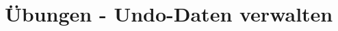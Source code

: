 \section{Übungen - Undo-Daten verwalten}
  \begin{enumerate}
    

    
    \begin{enumerate}
      

      

      

      

      

      
    \end{enumerate}
    
  \end{enumerate}
\clearpage